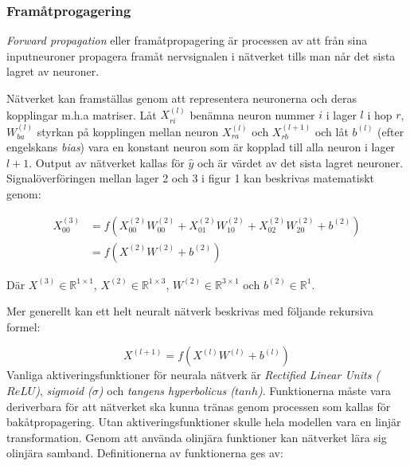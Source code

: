\documentclass[a4paper,11pt,twoside]{article}
\begin{document}
\subsubsection{Framåtprogagering}
\textit{Forward propagation} eller framåtpropagering är processen av att från sina inputneuroner propagera framåt nervsignalen i nätverket tills man når det sista lagret av neuroner.

Nätverket kan framställas genom att representera neuronerna och deras kopplingar m.h.a matriser. Låt $X_{ri}^{(l)}$ benämna neuron nummer $i$ i lager $l$ i hop $r$, $W_{ba}^{(l)}$ styrkan på kopplingen mellan neuron $X_{ra}^{(l)}$ och $X_{rb}^{(l+1)}$ och låt $b^{(l)}$ (efter engelskans \textit{bias}) vara en konstant neuron som är kopplad till alla neuron i lager $l+1$. Output av nätverket kallas för $\hat{y}$ och är värdet av det sista lagret neuroner. Signalöverföringen mellan lager 2 och 3 i figur 1 kan beskrivas matematiskt genom:

\begin{equation}
\begin{split}
X_{00}^{(3)} & = f(X_{00}^{(2)}W_{00}^{(2)} + X_{01}^{(2)}W_{10}^{(2)} + X_{02}^{(2)}W_{20}^{(2)} + b^{(2)}) \\
			 & = f(X^{(2)}W^{(2)} +b^{(2)})
\end{split}
\end{equation}

Där $X^{(3)} \in \mathbb{R}^{1 \times 1}$, $X^{(2)} \in \mathbb{R}^{1 \times 3}$, $W^{(2)} \in \mathbb{R}^{3 \times 1}$ och $b^{(2)} \in \mathbb{R}^{1}$.

Mer generellt kan ett helt neuralt nätverk beskrivas med följande rekursiva formel:

\begin{equation}\label{feed-forward}
X^{(l+1)} = f(X^{(l)}W^{(l)} +b^{(l)})
\end{equation}
Vanliga aktiveringsfunktioner för neurala nätverk är \textit{Rectified Linear Units ($ReLU$)}, \textit{sigmoid ($\sigma$)} och \textit{tangens hyperbolicus ($tanh$)}. Funktionerna måste vara deriverbara för att nätverket ska kunna tränas genom processen som kallas för bakåtpropagering. Utan aktiveringsfunktioner skulle hela modellen vara en linjär transformation. Genom att använda olinjära funktioner kan nätverket lära sig olinjära samband. Definitionerna av funktionerna ges av:
\end{document}
